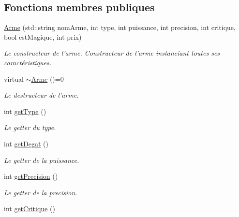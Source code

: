 \subsection*{Fonctions membres publiques}
\begin{DoxyCompactItemize}
\item 
\hyperlink{classArme_ac0d1cd3296095d25bb2d2f3f50b9f659}{Arme} (std\-::string nom\-Arme, int type, int puissance, int precision, int critique, bool est\-Magique, int prix)
\begin{DoxyCompactList}\small\item\em Le constructeur de l'arme. Constructeur de l'arme instanciant toutes ses caractéristiques. \end{DoxyCompactList}\item 
\hypertarget{classArme_a78288a7d593b4a494f6020f30c5c2383}{virtual \hyperlink{classArme_a78288a7d593b4a494f6020f30c5c2383}{$\sim$\-Arme} ()=0}\label{classArme_a78288a7d593b4a494f6020f30c5c2383}

\begin{DoxyCompactList}\small\item\em Le destructeur de l'arme. \end{DoxyCompactList}\item 
\hypertarget{classArme_a27433c557757a45b7a129bd8e08f6427}{int \hyperlink{classArme_a27433c557757a45b7a129bd8e08f6427}{get\-Type} ()}\label{classArme_a27433c557757a45b7a129bd8e08f6427}

\begin{DoxyCompactList}\small\item\em Le getter du type. \end{DoxyCompactList}\item 
\hypertarget{classArme_a06ced3532b0e60cc900674a94c0cf29b}{int \hyperlink{classArme_a06ced3532b0e60cc900674a94c0cf29b}{get\-Degat} ()}\label{classArme_a06ced3532b0e60cc900674a94c0cf29b}

\begin{DoxyCompactList}\small\item\em Le getter de la puissance. \end{DoxyCompactList}\item 
\hypertarget{classArme_a17e1484872db400cb4c609fa948d1e8a}{int \hyperlink{classArme_a17e1484872db400cb4c609fa948d1e8a}{get\-Precision} ()}\label{classArme_a17e1484872db400cb4c609fa948d1e8a}

\begin{DoxyCompactList}\small\item\em Le getter de la precision. \end{DoxyCompactList}\item 
\hypertarget{classArme_ae228795835d752d3e9dbb1d1c1a167d2}{int \hyperlink{classArme_ae228795835d752d3e9dbb1d1c1a167d2}{get\-Critique} ()}\label{classArme_ae228795835d752d3e9dbb1d1c1a167d2}


\end{DoxyCompactItemize}
